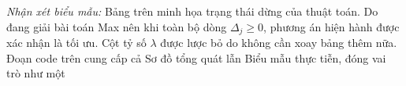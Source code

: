 \textit{Nhận xét biểu mẫu:} Bảng trên minh họa trạng thái dừng của thuật toán. Do đang giải bài toán Max nên khi toàn bộ dòng $\Delta_j \ge 0$, phương án hiện hành được xác nhận là tối ưu. Cột tỷ số $\lambda$ được lược bỏ do không cần xoay bảng thêm nữa.
Đoạn code trên cung cấp cả Sơ đồ tổng quát lẫn Biểu mẫu thực tiễn, đóng vai trò như một 